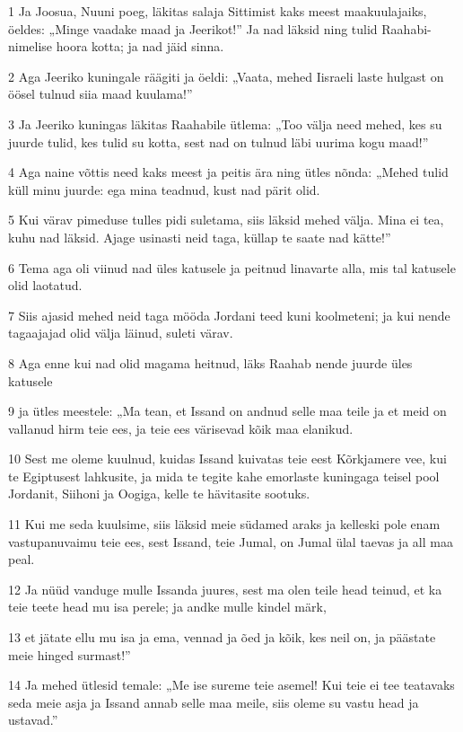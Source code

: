 \par 1 Ja Joosua, Nuuni poeg, läkitas salaja Sittimist kaks meest maakuulajaiks, öeldes: „Minge vaadake maad ja Jeerikot!” Ja nad läksid ning tulid Raahabi-nimelise hoora kotta; ja nad jäid sinna.
\par 2 Aga Jeeriko kuningale räägiti ja öeldi: „Vaata, mehed Iisraeli laste hulgast on öösel tulnud siia maad kuulama!”
\par 3 Ja Jeeriko kuningas läkitas Raahabile ütlema: „Too välja need mehed, kes su juurde tulid, kes tulid su kotta, sest nad on tulnud läbi uurima kogu maad!”
\par 4 Aga naine võttis need kaks meest ja peitis ära ning ütles nõnda: „Mehed tulid küll minu juurde: ega mina teadnud, kust nad pärit olid.
\par 5 Kui värav pimeduse tulles pidi suletama, siis läksid mehed välja. Mina ei tea, kuhu nad läksid. Ajage usinasti neid taga, küllap te saate nad kätte!”
\par 6 Tema aga oli viinud nad üles katusele ja peitnud linavarte alla, mis tal katusele olid laotatud.
\par 7 Siis ajasid mehed neid taga mööda Jordani teed kuni koolmeteni; ja kui nende tagaajajad olid välja läinud, suleti värav.
\par 8 Aga enne kui nad olid magama heitnud, läks Raahab nende juurde üles katusele
\par 9 ja ütles meestele: „Ma tean, et Issand on andnud selle maa teile ja et meid on vallanud hirm teie ees, ja teie ees värisevad kõik maa elanikud.
\par 10 Sest me oleme kuulnud, kuidas Issand kuivatas teie eest Kõrkjamere vee, kui te Egiptusest lahkusite, ja mida te tegite kahe emorlaste kuningaga teisel pool Jordanit, Siihoni ja Oogiga, kelle te hävitasite sootuks.
\par 11 Kui me seda kuulsime, siis läksid meie südamed araks ja kelleski pole enam vastupanuvaimu teie ees, sest Issand, teie Jumal, on Jumal ülal taevas ja all maa peal.
\par 12 Ja nüüd vanduge mulle Issanda juures, sest ma olen teile head teinud, et ka teie teete head mu isa perele; ja andke mulle kindel märk,
\par 13 et jätate ellu mu isa ja ema, vennad ja õed ja kõik, kes neil on, ja päästate meie hinged surmast!”
\par 14 Ja mehed ütlesid temale: „Me ise sureme teie asemel! Kui teie ei tee teatavaks seda meie asja ja Issand annab selle maa meile, siis oleme su vastu head ja ustavad.”
